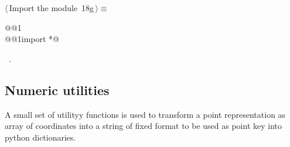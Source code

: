 \documentclass[11pt,oneside]{article}	%
\begin{document}

\begin{flushleft} \small \label{scrap44}
\protect{}$\langle\,$Import the module\nobreak\ {\footnotesize 18g}$\,\rangle\equiv$
\vspace{-1ex}
\begin{list}{}{} \item
\mbox{}\verb@import @@1\verb@@\\
\mbox{}\verb@from @@1\verb@ import *@\\
\mbox{}\verb@@{\NWsep}
\end{list}
\vspace{-1ex}
\footnotesize\addtolength{\baselineskip}{-1ex}
\begin{list}{}{\setlength{\itemsep}{-\parsep}\setlength{\itemindent}{-\leftmargin}}
\item \NWtxtMacroRefIn\ .
\end{list}
\end{flushleft}


\subsection{Numeric utilities}

A small set of utilityy functions is used to transform a point representation as array of coordinates into a string of fixed format to be used as point key into python dictionaries.
\end{document}
